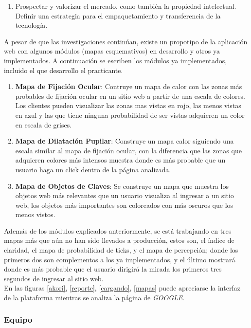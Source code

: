 {\begin{enumerate}
				\item Prospectar y valorizar el mercado, como también la propiedad intelectual. Definir una estrategia para el empaquetamiento y transferencia de la tecnología.
			\end{enumerate}
			A pesar de que las investigaciones continúan, existe un propotipo de la aplicación web
			con algunos módulos (mapas esquemativos) en desarrollo y otros ya implementados. A continuación se escriben los módulos ya implementados, incluido el que desarrollo el practicante.
				\begin{enumerate}
					\item \textbf{Mapa de Fijación Ocular}: Contruye un mapa de calor con las zonas
					más probables de fijación ocular en un sitio web a partir de una escala de 
					colores. Los clientes pueden visualizar las zonas mas vistas en rojo, las menos 
					vistas en azul y las que tiene ninguna probabilidad de ser vistas adquieren un 
					color en escala de grises.
					\item \textbf{Mapa de Dilatación Pupilar}: Construye un mapa calor siguiendo una
					escala similar al mapa de fijación ocular, con la diferencia que las zonas que 
					adquieren colores más intensos muestra donde es más probable que un usuario haga
					un click dentro de la página analizada.
					\item \textbf{Mapa de Objetos de Claves}: Se construye un mapa que muestra los
					objetos web más relevantes que un usuario visualiza al ingresar a un sitio web, 
					los objetos más importantes son coloreados con más oscuros que los menos vistos. 
				\end{enumerate}
			Además de los módulos explicados anteriormente, se está trabajando en tres mapas más 
			que aún no han sido llevados a producción, estos son, el índice de claridad, el mapa de 
			probabilidad de ticks, y el mapa de percepción; donde los primeros dos son complementos
			a los ya implementados, y el último mostrará donde es más probable que el usuario 
			dirigirá la mirada los primeros tres segundos de ingresar al sitio web. \\ 
			En las figuras \ref{akori}, \ref{reporte}, \ref{cargando}, \ref{mapas} puede apreciarse
			la interfaz de la plataforma mientras se analiza la página de \textit{GOOGLE}. 				 
			}
		
	\subsubsection{Equipo}
	
